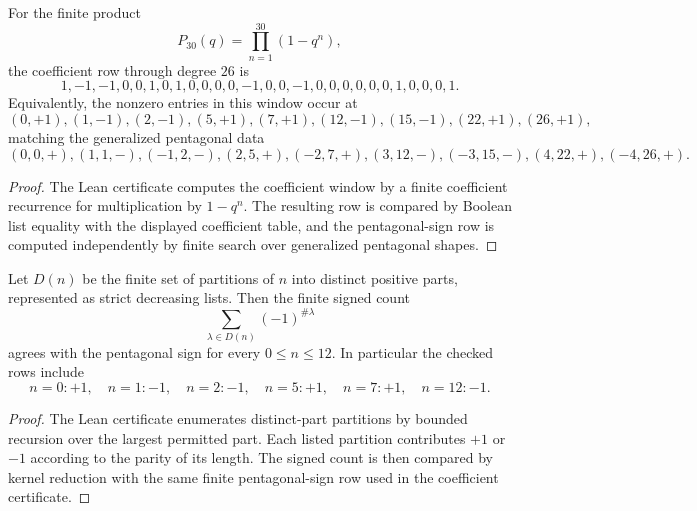 \begin{theorem}
\label{thm:euler-pentagonal-number-theorem-finite-euler-certificate}
For the finite product
$$
P_{30}(q)=\prod_{n=1}^{30}(1-q^n),
$$
the coefficient row through degree $26$ is
$$
1,-1,-1,0,0,1,0,1,0,0,0,0,-1,0,0,-1,0,0,0,0,0,0,1,0,0,0,1.
$$
Equivalently, the nonzero entries in this window occur at
$$
(0,+1),(1,-1),(2,-1),(5,+1),(7,+1),(12,-1),(15,-1),(22,+1),(26,+1),
$$
matching the generalized pentagonal data
$$
(0,0,+),(1,1,-),(-1,2,-),(2,5,+),(-2,7,+),(3,12,-),(-3,15,-),(4,22,+),(-4,26,+).
$$
\end{theorem}
\begin{proof}
The Lean certificate computes the coefficient window by a finite coefficient recurrence for multiplication by $1-q^n$. The resulting row is compared by Boolean list equality with the displayed coefficient table, and the pentagonal-sign row is computed independently by finite search over generalized pentagonal shapes.
\end{proof}

\begin{theorem}
\label{thm:euler-pentagonal-number-theorem-franklin-signed-count}
Let $D(n)$ be the finite set of partitions of $n$ into distinct positive parts, represented as strict decreasing lists. Then the finite signed count
$$
\sum_{\lambda\in D(n)}(-1)^{\#\lambda}
$$
agrees with the pentagonal sign for every $0\leq n\leq 12$. In particular the checked rows include
$$
n=0:+1,\quad n=1:-1,\quad n=2:-1,\quad n=5:+1,\quad n=7:+1,\quad n=12:-1.
$$
\end{theorem}
\begin{proof}
The Lean certificate enumerates distinct-part partitions by bounded recursion over the largest permitted part. Each listed partition contributes $+1$ or $-1$ according to the parity of its length. The signed count is then compared by kernel reduction with the same finite pentagonal-sign row used in the coefficient certificate.
\end{proof}

